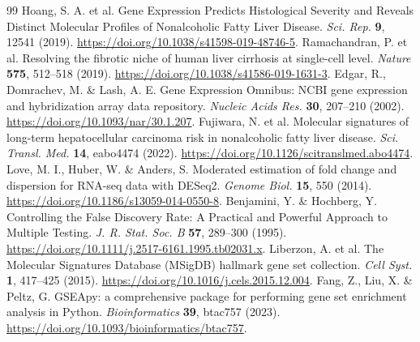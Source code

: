 \documentclass[11pt,a4paper]{article}
\begin{document}
\begin{thebibliography}{99}
 Hoang, S. A. et al. Gene Expression Predicts Histological Severity and Reveals Distinct Molecular Profiles of Nonalcoholic Fatty Liver Disease. \textit{Sci. Rep.} \textbf{9}, 12541 (2019). \url{https://doi.org/10.1038/s41598-019-48746-5}.
 Ramachandran, P. et al. Resolving the fibrotic niche of human liver cirrhosis at single-cell level. \textit{Nature} \textbf{575}, 512–518 (2019). \url{https://doi.org/10.1038/s41586-019-1631-3}.
 Edgar, R., Domrachev, M. \& Lash, A. E. Gene Expression Omnibus: NCBI gene expression and hybridization array data repository. \textit{Nucleic Acids Res.} \textbf{30}, 207–210 (2002). \url{https://doi.org/10.1093/nar/30.1.207}.
 Fujiwara, N. et al. Molecular signatures of long-term hepatocellular carcinoma risk in nonalcoholic fatty liver disease. \textit{Sci. Transl. Med.} \textbf{14}, eabo4474 (2022). \url{https://doi.org/10.1126/scitranslmed.abo4474}.
 Love, M. I., Huber, W. \& Anders, S. Moderated estimation of fold change and dispersion for RNA-seq data with DESeq2. \textit{Genome Biol.} \textbf{15}, 550 (2014). \url{https://doi.org/10.1186/s13059-014-0550-8}.
 Benjamini, Y. \& Hochberg, Y. Controlling the False Discovery Rate: A Practical and Powerful Approach to Multiple Testing. \textit{J. R. Stat. Soc. B} \textbf{57}, 289–300 (1995). \url{https://doi.org/10.1111/j.2517-6161.1995.tb02031.x}.
 Liberzon, A. et al. The Molecular Signatures Database (MSigDB) hallmark gene set collection. \textit{Cell Syst.} \textbf{1}, 417–425 (2015). \url{https://doi.org/10.1016/j.cels.2015.12.004}.
 Fang, Z., Liu, X. \& Peltz, G. GSEApy: a comprehensive package for performing gene set enrichment analysis in Python. \textit{Bioinformatics} \textbf{39}, btac757 (2023). \url{https://doi.org/10.1093/bioinformatics/btac757}.
\end{thebibliography}



\clearpage
\end{document}
